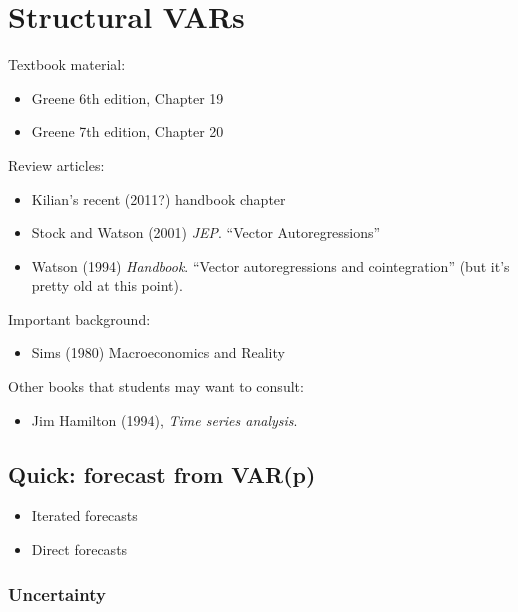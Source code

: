
\chapter{Structural VARs}

Textbook material:
\begin{itemize}
\item Greene 6th edition, Chapter 19
\item Greene 7th edition, Chapter 20
\end{itemize}
Review articles:
\begin{itemize}
\item Kilian's recent (2011?) handbook chapter
\item Stock and Watson (2001) \emph{JEP}. ``Vector Autoregressions''
\item Watson (1994) \emph{Handbook}. ``Vector autoregressions and
  cointegration'' (but it's pretty old at this point).
\end{itemize}
Important background:
\begin{itemize}
\item Sims (1980) Macroeconomics and Reality
\end{itemize}
Other books that students may want to consult:
\begin{itemize}
\item Jim Hamilton (1994), \emph{Time series analysis}.
\end{itemize}

\section{Quick: forecast from VAR(p)}

\begin{itemize}
\item Iterated forecasts
\item Direct forecasts
\end{itemize}

\subsection{Uncertainty}


